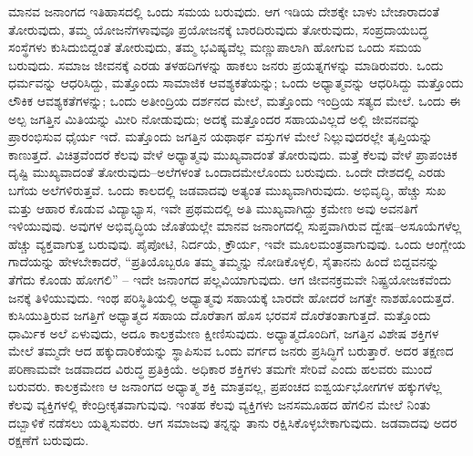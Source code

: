 ಮಾನವ ಜನಾಂಗದ ಇತಿಹಾಸದಲ್ಲಿ ಒಂದು ಸಮಯ ಬರುವುದು. ಆಗ ಇಡಿಯ ದೇಶಕ್ಕೇ ಬಾಳು ಬೇಜಾರಾದಂತೆ ತೋರುವುದು, ತಮ್ಮ ಯೋಜನೆಗಳಾವುವೂ ಪ್ರಯೋಜನಕ್ಕೆ ಬಾರದಿರುವುದು ತೋರುವುದು, ಸಂಪ್ರದಾಯಬದ್ಧ ಸಂಸ್ಥೆಗಳು ಕುಸಿದುಬಿದ್ದಂತೆ ತೋರುವುದು, ತಮ್ಮ ಭವಿಷ್ಯವೆಲ್ಲ ಮಣ್ಣುಪಾಲಾಗಿ ಹೋಗುವ ಒಂದು ಸಮಯ ಬರುವುದು. ಸಮಾಜ ಜೀವನಕ್ಕೆ ಎರಡು ತಳಹದಿಗಳನ್ನು ಹಾಕಲು ಜನರು ಪ್ರಯತ್ನಗಳನ್ನು ಮಾಡಿರುವರು. ಒಂದು ಧರ್ಮವನ್ನು ಆಧರಿಸಿದ್ದು, ಮತ್ತೊಂದು ಸಾಮಾಜಿಕ ಆವಶ್ಯಕತೆ\-ಯನ್ನು; ಒಂದು ಅಧ್ಯಾತ್ಮವನ್ನು ಆಧರಿಸಿದ್ದು ಮತ್ತೊಂದು ಲೌಕಿಕ ಆವಶ್ಯಕತೆಗಳನ್ನು; ಒಂದು ಅತೀಂದ್ರಿಯ ದರ್ಶನದ ಮೇಲೆ, ಮತ್ತೊಂದು ಇಂದ್ರಿಯ ಸತ್ಯದ ಮೇಲೆ. ಒಂದು ಈ ಅಲ್ಪ ಜಗತ್ತಿನ ಮಿತಿಯನ್ನು ಮೀರಿ ನೋಡುವುದು; ಅದಕ್ಕೆ ಮತ್ತೊಂದರ ಸಹಾಯವಿಲ್ಲದೆ ಅಲ್ಲಿ ಜೀವನವನ್ನು ಪ್ರಾರಂಭಿಸುವ ಧೈರ್ಯ ಇದೆ. ಮತ್ತೊಂದು ಜಗತ್ತಿನ ಯಥಾರ್ಥ ವಸ್ತುಗಳ ಮೇಲೆ ನಿಲ್ಲುವುದರಲ್ಲೇ ತೃಪ್ತಿಯನ್ನು ಕಾಣುತ್ತದೆ. ವಿಚಿತ್ರವೆಂದರೆ ಕೆಲವು ವೇಳೆ ಅಧ್ಯಾತ್ಮವು ಮುಖ್ಯವಾದಂತೆ ತೋರುವುದು. ಮತ್ತೆ ಕೆಲವು ವೇಳೆ ಪ್ರಾಪಂಚಿಕ ದೃಷ್ಟಿ ಮುಖ್ಯವಾದಂತೆ ತೋರುವುದು–ಅಲೆಗಳಂತೆ ಒಂದಾದಮೇಲೊಂದು ಬರುವುದು. ಒಂದೇ ದೇಶದಲ್ಲಿ ಎರಡು ಬಗೆಯ ಅಲೆಗಳಿರುತ್ತವೆ. ಒಂದು ಕಾಲದಲ್ಲಿ ಜಡವಾದವು ಅತ್ಯಂತ ಮುಖ್ಯವಾಗಿರುವುದು. ಅಭಿವೃದ್ಧಿ, ಹೆಚ್ಚು ಸುಖ ಮತ್ತು ಆಹಾರ ಕೊಡುವ ವಿದ್ಯಾಭ್ಯಾಸ, ಇವೇ ಪ್ರಥಮದಲ್ಲಿ ಅತಿ ಮುಖ್ಯವಾಗಿದ್ದು ಕ್ರಮೇಣ ಅವು ಅವನತಿಗೆ ಇಳಿಯುವುವು. ಅವುಗಳ ಅಭಿವೃದ್ಧಿಯ ಜೊತೆಯಲ್ಲೇ ಮಾನವ ಜನಾಂಗದಲ್ಲಿ ಸುಪ್ತವಾಗಿರುವ ದ್ವೇಷ–ಅಸೂಯೆಗಳೆಲ್ಲ ಹೆಚ್ಚು ವ್ಯಕ್ತವಾಗುತ್ತ ಬರುವುವು. ಪೈಪೋಟಿ, ನಿರ್ದಯೆ, ಕ್ರೌರ್ಯ, ಇವೇ ಮೂಲಮಂತ್ರವಾಗುವುವು. ಒಂದು ಆಂಗ್ಲೇಯ ಗಾದೆಯನ್ನು ಹೇಳಬೇಕಾದರೆ, “ಪ್ರತಿಯೊಬ್ಬರೂ ತಮ್ಮ ತಮ್ಮನ್ನು ನೋಡಿಕೊಳ್ಳಲಿ, ಸೈತಾನನು ಹಿಂದೆ ಬಿದ್ದವನನ್ನು ತೆಗೆದು\- ಕೊಂಡು ಹೋಗಲಿ” – ಇದೇ ಜನಾಂಗದ ಪಲ್ಲವಿಯಾಗುವುದು. ಆಗ ಜೀವನಕ್ರಮವೇ ನಿಷ್ಪ್ರಯೋಜಕವೆಂದು ಜನಕ್ಕೆ ತಿಳಿಯುವುದು. ಇಂಥ ಪರಿಸ್ಥಿತಿಯಲ್ಲಿ ಅಧ್ಯಾತ್ಮವು ಸಹಾಯಕ್ಕೆ ಬಾರದೇ ಹೋದರೆ ಜಗತ್ತೇ ನಾಶಹೊಂದುತ್ತದೆ. ಕುಸಿಯುತ್ತಿರುವ ಜಗತ್ತಿಗೆ ಅಧ್ಯಾತ್ಮದ ಸಹಾಯ ದೊರೆತಾಗ ಹೊಸ ಭರವಸೆ ದೊರೆತಂತಾಗುತ್ತದೆ. ಮತ್ತೊಂದು ಧಾರ್ಮಿಕ ಅಲೆ ಏಳುವುದು, ಅದೂ ಕಾಲಕ್ರಮೇಣ ಕ್ಷೀಣಿಸುವುದು. ಅಧ್ಯಾತ್ಮದೊಂದಿಗೆ, ಜಗತ್ತಿನ ವಿಶೇಷ ಶಕ್ತಿಗಳ ಮೇಲೆ ತಮ್ಮದೇ ಆದ ಹಕ್ಕುದಾರಿಕೆಯನ್ನು ಸ್ಥಾಪಿಸುವ ಒಂದು ವರ್ಗದ ಜನರು ಪ್ರಸಿದ್ಧಿಗೆ ಬರುತ್ತಾರೆ. ಅದರ ತಕ್ಷಣದ ಪರಿಣಾಮವೇ ಜಡವಾದದ ವಿರುದ್ಧ ಪ್ರತಿಕ್ರಿಯೆ. ಅಧಿಕಾರ ಶಕ್ತಿಗಳು ತಮಗೇ ಸೇರಿವೆ ಎಂದು ಹಲವರು ಮುಂದೆ ಬರುವರು. ಕಾಲಕ್ರಮೇಣ ಆ ಜನಾಂಗದ ಅಧ್ಯಾತ್ಮ ಶಕ್ತಿ ಮಾತ್ರವಲ್ಲ, ಪ್ರಪಂಚದ ಐಶ್ವರ್ಯಭೋಗಗಳ ಹಕ್ಕುಗಳೆಲ್ಲ ಕೆಲವು ವ್ಯಕ್ತಿಗಳಲ್ಲಿ ಕೇಂದ್ರೀಕೃತವಾಗುವುವು. ಇಂತಹ ಕೆಲವು ವ್ಯಕ್ತಿಗಳು ಜನಸಮೂಹದ ಹೆಗಲಿನ ಮೇಲೆ ನಿಂತು ದಬ್ಬಾಳಿಕೆ ನಡೆಸಲು ಯತ್ನಿಸುವರು. ಆಗ ಸಮಾಜವು ತನ್ನನ್ನು ತಾನು ರಕ್ಷಿಸಿಕೊಳ್ಳಬೇಕಾಗುವುದು. ಜಡವಾದವು ಅದರ ರಕ್ಷಣೆಗೆ ಬರುವುದು.

